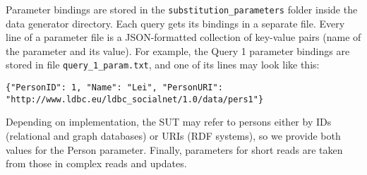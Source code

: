 Parameter bindings are stored in the \texttt{substitution\_parameters} folder
inside the data generator directory. Each query gets its bindings in a separate
file. Every line of a parameter file is a JSON-formatted collection of
key-value pairs (name of the parameter and its value). For example, the Query 1
parameter bindings are stored in file \texttt{query\_1\_param.txt}, and one of
its lines may look like this:

\begin{lstlisting}
{"PersonID": 1, "Name": "Lei", "PersonURI": "http://www.ldbc.eu/ldbc_socialnet/1.0/data/pers1"}
\end{lstlisting}

Depending on implementation, the SUT may refer to persons either by IDs
(relational and graph databases) or URIs (RDF systems), so we provide both
values for the Person parameter.  Finally, parameters for short reads are taken
from those in complex reads and updates.
